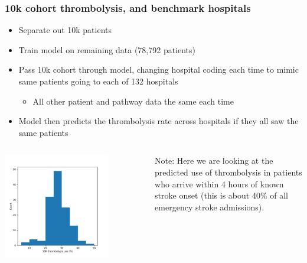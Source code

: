 \documentclass[xcolor={usenames,dvipsnames}]{beamer}
\begin{document}
\begin{frame}
\frametitle{10k cohort thrombolysis, and benchmark hospitals}

\begin{itemize}
  \footnotesize
  \item Separate out 10k patients 
  \item Train model on remaining data (78,792 patients)
  \item Pass 10k cohort through model, changing hospital coding each time to mimic same patients going to each of 132 hospitals
  \begin{itemize} 
    \item All other patient and pathway data the same each time
  \end{itemize} 
  \item Model then predicts the thrombolysis rate across hospitals if they all saw the same patients
\end{itemize}

\begin{columns} 
    \begin{center} 
    \includegraphics[width=0.75\textwidth, trim={0em 0em 0em 4em}, clip]{./images/predicted_thrombolysis_use}
    \end{center} 
        
    {\tiny
    Note: Here we are looking at the predicted use of thrombolysis in patients who arrive within 4 hours of
    known stroke onset (this is about 40\% of all emergency stroke admissions).}
\end{columns}

\end{frame}
\end{document}
